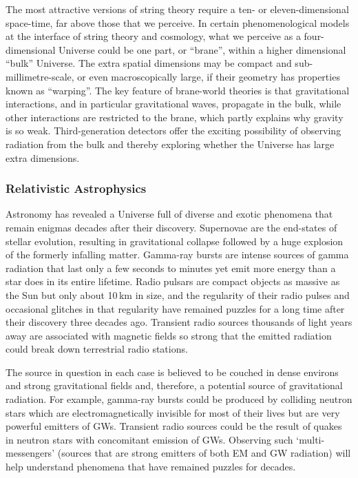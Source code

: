 The most attractive versions of string theory require a ten- or
eleven-dimensional space-time, far above those that we perceive.
In certain phenomenological models at the interface of string
theory and cosmology, what we perceive as a four-dimensional
Universe could be one part, or ``brane'', within a higher
dimensional ``bulk'' Universe. The extra spatial dimensions may
be compact and sub-millimetre-scale,
or even macroscopically large, if their geometry has
properties known as ``warping''. The key feature of brane-world
theories is that gravitational interactions, and in particular
gravitational waves, propagate in the bulk, while other interactions
are restricted to the brane, which partly explains why gravity is
so weak. 
Third-generation detectors offer 
the exciting possibility of observing radiation from the bulk and 
thereby exploring whether the Universe has large extra dimensions.



\FloatBarrier
\subsubsection{Relativistic Astrophysics}
Astronomy has revealed a Universe full of diverse and exotic
phenomena that remain enigmas decades after their discovery.
Supernovae are the end-states of stellar evolution, resulting in
gravitational collapse followed by a huge explosion of the formerly infalling matter.
Gamma-ray bursts are intense sources of gamma radiation that last
only a few seconds to minutes yet emit more energy than a star does
in its entire lifetime.
Radio pulsars are compact objects as massive as the Sun but only
about 10\,km in size, and the regularity of their radio pulses and
occasional glitches in that regularity have remained 
puzzles for a long time after their discovery three decades ago.
Transient radio sources thousands of light years away
are associated with magnetic fields so strong that the emitted radiation
could break down terrestrial radio stations.

The source in question in each case is believed to be couched in
dense environs and strong gravitational fields and, therefore,
a potential source of gravitational radiation. For example, gamma-ray
bursts could be produced by colliding neutron stars which are
electromagnetically invisible for most of their lives but are very
powerful emitters of GWs. Transient radio sources could be the
result of quakes in neutron stars with concomitant emission of GWs.
Observing such `multi-messengers' (sources that are strong emitters of
both EM and GW radiation) will help understand phenomena that
have remained puzzles for decades.

